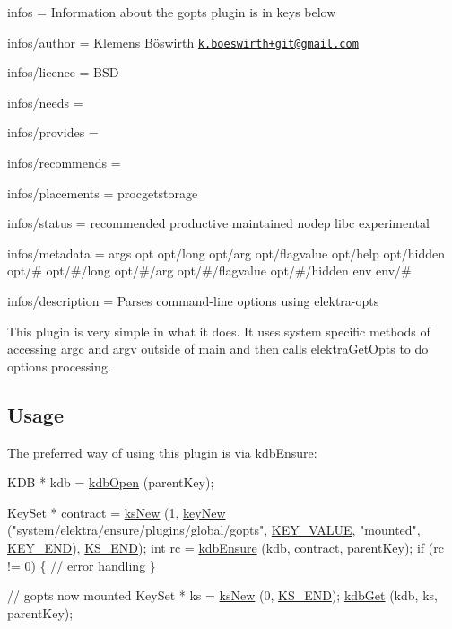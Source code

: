 
\begin{DoxyItemize}
\item infos = Information about the gopts plugin is in keys below
\item infos/author = Klemens Böswirth \href{mailto:k.boeswirth+git@gmail.com}{\tt k.\+boeswirth+git@gmail.\+com}
\item infos/licence = B\+SD
\item infos/needs =
\item infos/provides =
\item infos/recommends =
\item infos/placements = procgetstorage
\item infos/status = recommended productive maintained nodep libc experimental
\item infos/metadata = args opt opt/long opt/arg opt/flagvalue opt/help opt/hidden opt/\# opt/\#/long opt/\#/arg opt/\#/flagvalue opt/\#/hidden env env/\#
\item infos/description = Parses command-\/line options using elektra-\/opts
\end{DoxyItemize}

This plugin is very simple in what it does. It uses system specific methods of accessing {\ttfamily argc} and {\ttfamily argv} outside of {\ttfamily main} and then calls {\ttfamily elektra\+Get\+Opts} to do options processing.

\subsection*{Usage}

The preferred way of using this plugin is via {\ttfamily kdb\+Ensure}\+:


\begin{DoxyCode}
KDB * kdb = \hyperlink{group__kdb_ga6808defe5870f328dd17910aacbdc6ca}{kdbOpen} (parentKey);

KeySet * contract = \hyperlink{group__keyset_ga671e1aaee3ae9dc13b4834a4ddbd2c3c}{ksNew} (1, \hyperlink{group__key_gad23c65b44bf48d773759e1f9a4d43b89}{keyNew} (\textcolor{stringliteral}{"system/elektra/ensure/plugins/global/gopts"}, 
      \hyperlink{group__key_gga91fb3178848bd682000958089abbaf40ac66e4a49d09212b79f5754ca6db5bd2e}{KEY\_VALUE}, \textcolor{stringliteral}{"mounted"}, \hyperlink{group__key_gga91fb3178848bd682000958089abbaf40aa8adb6fcb92dec58fb19410eacfdd403}{KEY\_END}), \hyperlink{kdbenum_8c_a7a28fce3773b2c873c94ac80b8b4cd54}{KS\_END});
\textcolor{keywordtype}{int} rc = \hyperlink{group__kdb_ga0955373877575fa21275891518f8ab31}{kdbEnsure} (kdb, contract, parentKey);
\textcolor{keywordflow}{if} (rc != 0)
\{
        \textcolor{comment}{// error handling}
\}

\textcolor{comment}{// gopts now mounted}
KeySet * ks = \hyperlink{group__keyset_ga671e1aaee3ae9dc13b4834a4ddbd2c3c}{ksNew} (0, \hyperlink{kdbenum_8c_a7a28fce3773b2c873c94ac80b8b4cd54}{KS\_END});
\hyperlink{group__kdb_ga28e385fd9cb7ccfe0b2f1ed2f62453a1}{kdbGet} (kdb, ks, parentKey);
\end{DoxyCode}
 